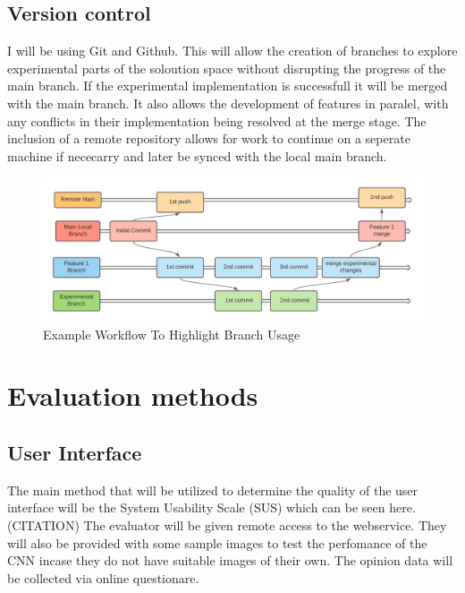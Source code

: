   \subsection{Version control}
    I will be using Git and Github. This will allow the creation of branches to explore experimental parts of the soloution space without disrupting the progress of the main branch. If the experimental implementation is successfull it will be merged with the main branch. It also allows the development of features in paralel, with any conflicts in their implementation being resolved at the merge stage. The inclusion of a remote repository allows for work to continue on a seperate machine if nececarry and later be synced with the local main branch.
    \begin{figure}[H]
      \begin{center}
        \includegraphics[scale=0.7]{Images/Git_Workflow_Diagram}
        \caption{Example Workflow To Highlight Branch Usage}
        \label{fig:Git Workflow}
      \end{center}
    \end{figure}

\section{Evaluation methods}
  \subsection{User Interface}
  The main method that will be utilized to determine the quality of the user interface will be the System Usability Scale (SUS) which can be seen here. (CITATION) %
  The evaluator will be given remote access to the webservice. They will also be provided with some sample images to test the perfomance of the CNN incase they do not have suitable images of their own.
  The opinion data will be collected via online questionare.
